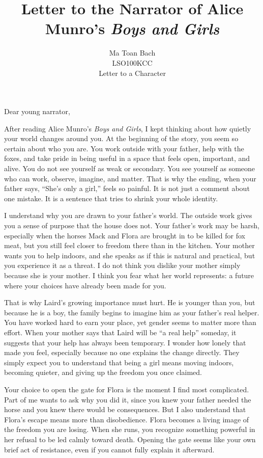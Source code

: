 \documentclass[12pt]{article}
\title{Letter to the Narrator of Alice Munro's \textit{Boys and Girls}}
\author{%
  Ma Toan Bach\\
  LSO100KCC\\
  Letter to a Character
}
\date{}
\begin{document}
\maketitle

\noindent Dear young narrator,

After reading Alice Munro's \textit{Boys and Girls}, I kept thinking about how quietly your world changes around you. At the beginning of the story, you seem so certain about who you are. You work outside with your father, help with the foxes, and take pride in being useful in a space that feels open, important, and alive. You do not see yourself as weak or secondary. You see yourself as someone who can work, observe, imagine, and matter. That is why the ending, when your father says, ``She's only a girl,'' feels so painful. It is not just a comment about one mistake. It is a sentence that tries to shrink your whole identity.

I understand why you are drawn to your father's world. The outside work gives you a sense of purpose that the house does not. Your father's work may be harsh, especially when the horses Mack and Flora are brought in to be killed for fox meat, but you still feel closer to freedom there than in the kitchen. Your mother wants you to help indoors, and she speaks as if this is natural and practical, but you experience it as a threat. I do not think you dislike your mother simply because she is your mother. I think you fear what her world represents: a future where your choices have already been made for you.

That is why Laird's growing importance must hurt. He is younger than you, but because he is a boy, the family begins to imagine him as your father's real helper. You have worked hard to earn your place, yet gender seems to matter more than effort. When your mother says that Laird will be ``a real help'' someday, it suggests that your help has always been temporary. I wonder how lonely that made you feel, especially because no one explains the change directly. They simply expect you to understand that being a girl means moving indoors, becoming quieter, and giving up the freedom you once claimed.

Your choice to open the gate for Flora is the moment I find most complicated. Part of me wants to ask why you did it, since you knew your father needed the horse and you knew there would be consequences. But I also understand that Flora's escape means more than disobedience. Flora becomes a living image of the freedom you are losing. When she runs, you recognize something powerful in her refusal to be led calmly toward death. Opening the gate seems like your own brief act of resistance, even if you cannot fully explain it afterward.
\end{document}
